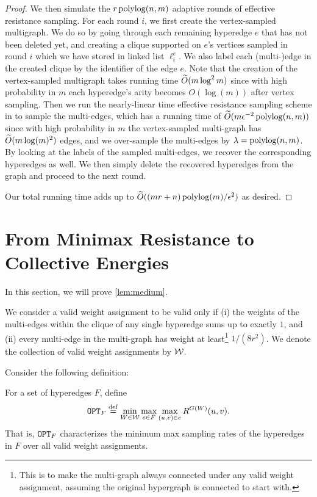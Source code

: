 \documentclass{article}
\begin{document}
\begin{proof}
We then simulate the $r \operatorname{polylog}(n,m)$ adaptive rounds of effective resistance sampling. For each round $i$, we first create the vertex-sampled multigraph.
We do so by going through each remaining hyperedge $e$
that has not been deleted yet,
and creating a clique
supported on $e$'s vertices sampled in round $i$
which we have stored in linked list $\ell_i^e$. We also label each (multi-)edge
in the created clique by the identifier of the edge $e$.
Note that the creation of the vertex-sampled multigraph takes running time
$\widetilde{O}(m \log^2 m)$ since with high probability in $m$ each hyperedge's arity becomes
$O(\log(m))$ after vertex sampling.
Then we run
the nearly-linear time effective resistance sampling scheme in \cite{SS11}
to sample the multi-edges, which has a
running time of $\widetilde{O}(m \epsilon^{-2} \operatorname{polylog}(n,m))$ since with high probability in $m$
the vertex-sampled multi-graph has $\widetilde{O}(m \log(m)^2)$ edges,
and we over-sample the multi-edges by $\lambda = \operatorname{polylog}(n,m)$.
By looking at the labels
of the sampled multi-edges, we recover the corresponding
hyperedges as well. We then simply delete the recovered hyperedges from the graph and
proceed to the next round.

Our total running time adds up to $\widetilde{O}((mr+n) \operatorname{polylog}(m)/\epsilon^2)$ as desired.
\end{proof}

\section{From Minimax Resistance to Collective Energies} \label{sec:duality}

In this section, we will prove \cref{lem:medium}.

We consider a valid weight assignment
to be valid only if (i) the weights of the multi-edges within the clique of any single
hyperedge sums up to exactly $1$, and (ii) every multi-edge in the multi-graph has
weight at least\footnote{This is to make the multi-graph
always connected under any valid weight assignment, assuming the original hypergraph
is connected to start with.} $1/(8r^2)$. We denote the collection of valid weight assignments
by $\mathcal{W}$.

Consider the following definition:
\begin{definition}
    For a set of hyperedges $F$, define
    \begin{align*}
        \mathtt{OPT}_F \stackrel{\mathrm{def}}{=}
        \min_{W\in \mathcal{W}} \max_{e\in F}
        \max_{(u,v)\in e} R^{G(W)}(u,v).
    \end{align*}
    That is, $\mathtt{OPT}_F$ characterizes
    the minimum max sampling rates of the hyperedges in $F$
    over all valid weight assignments.
\end{definition}
\end{document}
